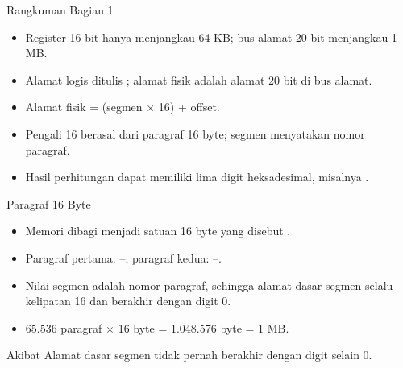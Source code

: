\documentclass[aspectratio=169,11pt]{beamer}
\begin{document}
\begin{frame}{Rangkuman Bagian 1}
\small
\begin{itemize}
    \item Register 16 bit hanya menjangkau 64 KB; bus alamat 20 bit
          menjangkau 1 MB.

    \vspace{0.15em}
    \item Alamat logis ditulis ; alamat fisik
          adalah alamat 20 bit di bus alamat.

    \vspace{0.15em}
    \item Alamat fisik = (segmen $\times$ 16) + offset.

    \vspace{0.15em}
    \item Pengali 16 berasal dari paragraf 16 byte; segmen
          menyatakan nomor paragraf.

    \vspace{0.15em}
    \item Hasil perhitungan dapat memiliki lima digit
          heksadesimal, misalnya .
\end{itemize}
\end{frame}


\begin{frame}{Paragraf 16 Byte}
\small
\begin{itemize}
    \item Memori dibagi menjadi satuan 16 byte yang disebut
          .

    \vspace{0.18em}
    \item Paragraf pertama: --; paragraf
          kedua: --.

    \vspace{0.18em}
    \item Nilai segmen adalah nomor paragraf, sehingga alamat dasar
          segmen selalu kelipatan 16 dan berakhir dengan digit 0.

    \vspace{0.18em}
    \item 65.536 paragraf $\times$ 16 byte = 1.048.576 byte = 1 MB.
\end{itemize}

\vspace{0.25em}
\begin{block}{Akibat}
\small Alamat dasar segmen tidak pernah berakhir dengan digit
selain 0.
\end{block}
\end{frame}
\end{document}
